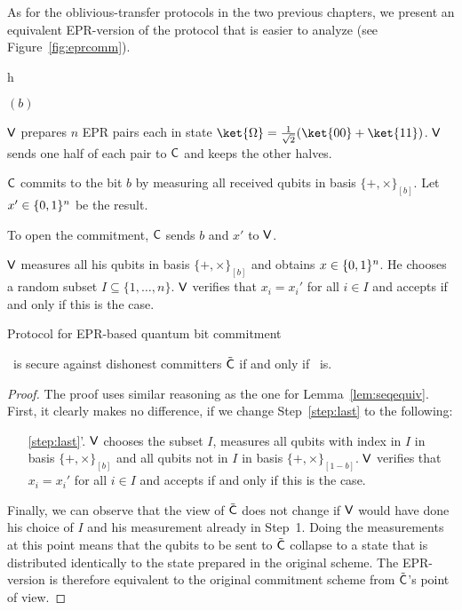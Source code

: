 As for the oblivious-transfer protocols in the two previous chapters, we present an
equivalent EPR-version of the protocol that is easier to analyze (see
Figure~\ref{fig:eprcomm}). 
\begin{myfigure}{h}
\begin{myprotocol}{\eprcomm$(b)$}
\item ${\sf V}$ prepares $n$ EPR pairs each in state
  $\ket{\Omega}=\frac{1}{\sqrt{2}}(\ket{00}+\ket{11})$. ${\sf V}$ sends one half of each pair to ${\sf C}$ and keeps the other halves.
\item ${\sf C}$ commits to the bit $b$ by measuring all received qubits in basis
  $\{+,\times \}_{[b]}$. Let $x' \in \{0,1\}^n$ be the result.
\item To open the commitment, ${\sf C}$ sends $b$ and $x'$ to ${\sf V}$.\label{step:epropen}
\item ${\sf V}$ measures all his qubits in basis $\{+,\times \}_{[b]}$ and
  obtains $x \in \{0,1\}^n$.  He chooses a random subset $I \subseteq \{1,
  \ldots ,n\}$. ${\sf V}$ verifies that
  $x_i= x_i'$ for all $i \in I$ and accepts if and only if this is the
  case.\label{step:last}
\end{myprotocol}
\caption{Protocol for EPR-based quantum bit commitment}\label{fig:eprcomm}
\end{myfigure}

\begin{lemma}\label{lem:commeprcomm}
  \comm\ is secure against dishonest committers $\tilde{\sf C}$ if and only if \eprcomm\ is.
\end{lemma}
\begin{proof}
The proof uses similar reasoning as the one for Lemma~\ref{lem:seqequiv}. 
First, it clearly makes no difference, if we change Step~\ref{step:last} to the
following:
\begin{itemize}
\item[\ref{step:last}'.] ${\sf V}$ chooses the subset $I$, measures all
  qubits with index in $I$ in basis $\{+,\times \}_{[b]}$ and all
  qubits not in $I$ in basis $\{+,\times \}_{[1-b]}$. ${\sf V}$ verifies
  that $x_i= x_i'$ for all $i\in I$ and accepts if and only if this is
  the case.
\end{itemize}
Finally, we can observe that the view of $\tilde{\sf C}$ does not change if ${\sf V}$
would have done his choice of $I$ and his measurement already in
Step~1. Doing the measurements at this point means that the qubits to
be sent to $\tilde{\sf C}$ collapse to a state that is distributed identically to
the state prepared in the original scheme. The EPR-version is
therefore equivalent to the original commitment scheme from $\tilde{\sf C}$'s
point of view.
\end{proof}


